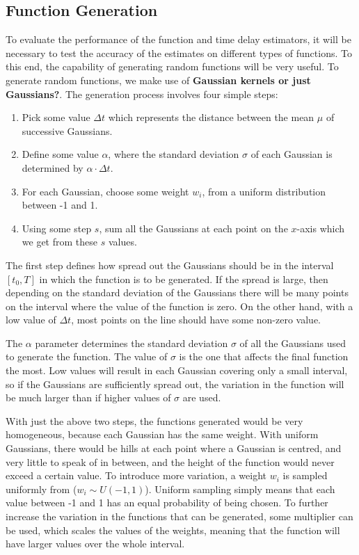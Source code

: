 \documentclass[a4paper,11pt]{article}
\begin{document}
\subsection{Function Generation}
\label{sec-5-1}

To evaluate the performance of the function and time delay estimators, it will
be necessary to test the accuracy of the estimates on different types of
functions. To this end, the capability of generating random functions will be
very useful. To generate random functions, we make use of \textbf{Gaussian
kernels or just Gaussians?}. The generation process involves four simple steps:
\begin{enumerate}
\item Pick some value $\Delta t$ which represents the distance between the mean
   $\mu$ of successive Gaussians.
\item Define some value $\alpha$, where the standard deviation $\sigma$ of each
   Gaussian is determined by $\alpha\cdot\Delta t$.
\item For each Gaussian, choose some weight $w_i$, from a uniform distribution
   between -1 and 1.
\item Using some step $s$, sum all the Gaussians at each point on the $x$-axis which
   we get from these $s$ values.
\end{enumerate}

The first step defines how spread out the Gaussians should be in the interval
$[t_0, T]$ in which the function is to be generated. If the spread is large,
then depending on the standard deviation of the Gaussians there will be many
points on the interval where the value of the function is zero. On the other
hand, with a low value of $\Delta t$, most points on the line should have some
non-zero value.

The $\alpha$ parameter determines the standard deviation $\sigma$ of all the Gaussians
used to generate the function. The value of $\sigma$ is the one that affects the
final function the most. Low values will result in each Gaussian covering only a
small interval, so if the Gaussians are sufficiently spread out, the variation
in the function will be much larger than if higher values of $\sigma$ are used.

With just the above two steps, the functions generated would be very
homogeneous, because each Gaussian has the same weight. With uniform Gaussians,
there would be hills at each point where a Gaussian is centred, and very little
to speak of in between, and the height of the function would never exceed a
certain value. To introduce more variation, a weight $w_i$ is sampled uniformly
from ($w_i \sim U(-1,1)$). Uniform sampling simply means that each value between
-1 and 1 has an equal probability of being chosen. To further increase the
variation in the functions that can be generated, some multiplier can be used,
which scales the values of the weights, meaning that the function will have
larger values over the whole interval.
\end{document}
